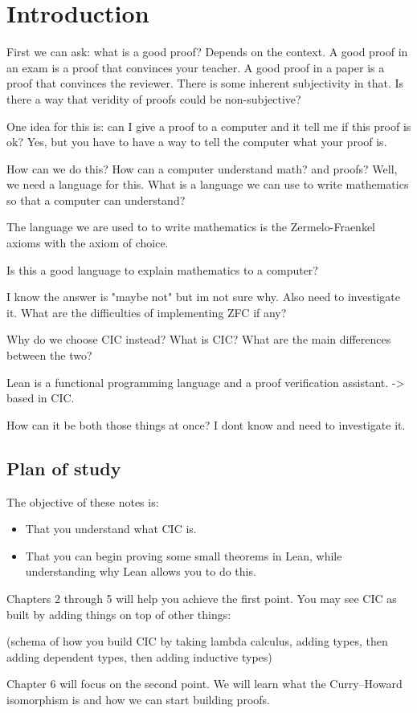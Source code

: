 \chapter*{Introduction}

First we can ask: what is a good proof? Depends on the context. A good proof in an exam is a proof that convinces your teacher. A good proof in a paper is a proof that convinces the reviewer. There is some inherent subjectivity in that. Is there a way that veridity of proofs could be non-subjective?

One idea for this is: can I give a proof to a computer and it tell me if this proof is ok? Yes, but you have to have a way to tell the computer what your proof is.

How can we do this? How can a computer understand math? and proofs? Well, we need a language for this. What is a language we can use to write mathematics so that a computer can understand?

The language we are used to to write mathematics is the Zermelo-Fraenkel axioms with the axiom of choice.


Is this a good language to explain mathematics to a computer?

I know the answer is "maybe not" but im not sure why. Also need to investigate it.
What are the difficulties of implementing ZFC if any?

Why do we choose CIC instead? What is CIC? What are the main differences between the two? 

Lean is a functional programming language and a proof verification assistant. -> based in CIC.

How can it be both those things at once? I dont know and need to investigate it.


\section*{Plan of study}

The objective of these notes is:
\begin{itemize}
  \item That you understand what CIC is.
  \item That you can begin proving some small theorems in Lean, while understanding why Lean allows you to do this. 
\end{itemize}

Chapters 2 through 5 will help you achieve the first point. You may see CIC as built by adding things on top of other things:

(schema of how you build CIC by taking lambda calculus, adding types, then adding dependent types, then adding inductive types)

Chapter 6 will focus on the second point. We will learn what the Curry--Howard isomorphism is and how we can start building proofs.